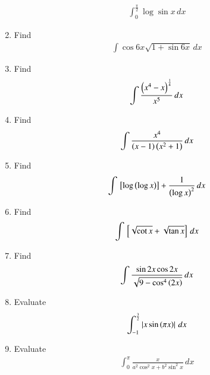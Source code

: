 \begin{enumerate}[label=\arabic*.,ref=\thesubsection.\theenumi]
\begin{align}
\int_{0}^{\frac{\pi}{2}}\log \sin x \,dx
\end{align}
%
\item Find
\begin{align}
\int\cos  6x\sqrt{1+\sin6x} \,dx
\end{align}
%
\item Find
\begin{align}
\int \frac{\left(x^4-x\right)^{\frac{1}{4}}}{x^5} \,dx
\end{align}
%
\item Find
\begin{align}
\int \frac{x^4}{\left(x-1\right)\left(x^2+1\right)} \,dx
\end{align}
%
\item Find
\begin{align}
\int {}\left[\log \left(\log x\right)\right]+\frac{1}{\left(\log x\right)^2} \,dx
\end{align}
%
\item Find
\begin{align}
\int {}\left[\sqrt{\cot x} + \sqrt{\tan x} \right]\,dx
\end{align}
%
\item Find
\begin{align}
\int \frac{\sin 2x \cos 2x }{\sqrt{9-\cos^4\left(2x\right)}}\,dx
\end{align}
%
\item Evaluate
\begin{align}
\int_{-1}^{\frac{3}{2}}\left\vert x\sin \left(\pi x\right)\right\vert \,dx
\end{align}
%
\item Evaluate
\begin{align}
\int_{0}^{\pi}\frac{x}{a^2\cos^2x + b^2\sin^2x} \,dx
\end{align}

\end{enumerate}
